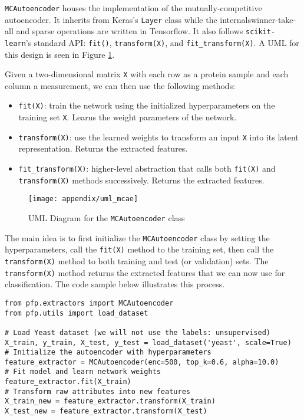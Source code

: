 \par \texttt{MCAutoencoder} houses the implementation of the
mutually-competitive autoencoder. It inherits from Keras's \texttt{Layer} class
while the internals\textemdash winner-take-all and sparse operations\textemdash
are written in Tensorflow. It also follows \texttt{scikit-learn}'s standard
API: \texttt{fit()}, \texttt{transform(X)}, and \texttt{fit\_transform(X)}. A
UML for this design is seen in Figure \ref{uml:mcae}. 

\par Given a two-dimensional matrix \texttt{X} with each row as a protein
sample and each column a measurement, we can then use the following methods:

\begin{itemize}
    \item \texttt{fit(X)}: train the network using the initialized
        hyperparameters on the training set \texttt{X}. Learns the weight
        parameters of the network.
    \item \texttt{transform(X)}: use the learned weights to transform an input
        \texttt{X} into its latent representation. Returns the extracted
        features.
    \item \texttt{fit\_transform(X)}: higher-level abstraction that calls both
        \texttt{fit(X)} and \texttt{transform(X)} methods successively. Returns
        the extracted features.
\end{itemize}

\begin{figure}[!h]
  \centering
    \texttt{[image: appendix/uml\_mcae]}
    \caption{UML Diagram for the \texttt{MCAutoencoder} class}
  \label{uml:mcae}
\end{figure}

\par The main idea is to first initialize the \texttt{MCAutoencoder} class by
setting the hyperparameters, call the \texttt{fit(X)} method to the training
set, then call the \texttt{transform(X)} method to both training and test (or
validation) sets. The \texttt{transform(X)} method returns the extracted
features that we can now use for classification. The code sample below
illustrates this process.

\begin{lstlisting}[style=mypython, caption=Minimal example for extracting
protein features]
from pfp.extractors import MCAutoencoder
from pfp.utils import load_dataset

# Load Yeast dataset (we will not use the labels: unsupervised)
X_train, y_train, X_test, y_test = load_dataset('yeast', scale=True)
# Initialize the autoencoder with hyperparameters
feature_extractor = MCAutoencoder(enc=500, top_k=0.6, alpha=10.0)
# Fit model and learn network weights
feature_extractor.fit(X_train)
# Transform raw attributes into new features
X_train_new = feature_extractor.transform(X_train)
X_test_new = feature_extractor.transform(X_test)
\end{lstlisting}

